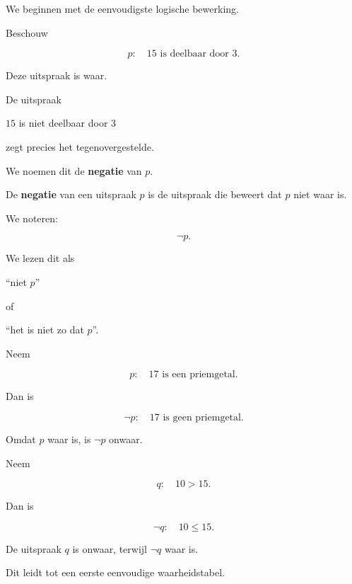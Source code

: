 \documentclass{ximera}
\begin{document}
  We beginnen met de eenvoudigste logische bewerking.

  Beschouw

  \[
  p:\quad 15\text{ is deelbaar door }3.
  \]

  Deze uitspraak is waar.

  De uitspraak

  \begin{center}
  $15$ is niet deelbaar door $3$
  \end{center}

  zegt precies het tegenovergestelde.

  We noemen dit de \textbf{negatie} van $p$.


  \begin{definitie}
  De \textbf{negatie} van een uitspraak $p$ is de uitspraak die beweert
  dat $p$ niet waar is.

  We noteren:

  \[
  \neg p.
  \]

  We lezen dit als

  \begin{center}
  ``niet $p$''
  \end{center}

  of

  \begin{center}
  ``het is niet zo dat $p$''.
  \end{center}
  \end{definitie}


  \begin{voorbeeld}

  Neem

  \[
  p:\quad 17\text{ is een priemgetal}.
  \]

  Dan is

  \[
  \neg p:\quad 17\text{ is geen priemgetal}.
  \]

  Omdat $p$ waar is, is $\neg p$ onwaar.
  \end{voorbeeld}


  \begin{voorbeeld}

  Neem

  \[
  q:\quad 10>15.
  \]

  Dan is

  \[
  \neg q:\quad 10\leq15.
  \]

  De uitspraak $q$ is onwaar, terwijl $\neg q$ waar is.
  \end{voorbeeld}


  Dit leidt tot een eerste eenvoudige waarheidstabel.
\end{document}

